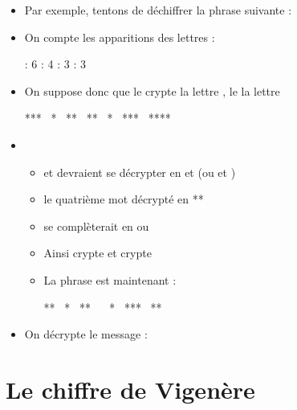 \begin{frame}

\begin{itemize}
        \item Par exemple, tentons de déchiffrer la phrase suivante : \\
\centerline{}
\pause  
  \item On compte les apparitions des lettres : \\
\centerline{ : 6 \qquad {} : 4 \qquad {} : 3 \qquad {} : 3}
\pause  
  \item On suppose donc que le  crypte la lettre , le  la lettre  \\
  \pause
\centerline{*** \ * \ ** \ ** \ * \ *** \ ****}
\pause   
  \item
  \begin{itemize}
    \item  {} et  devraient se décrypter en  et  (ou  et )
\pause  
    \item le quatrième mot  décrypté en **
\pause  
    \item se complèterait en  ou  
\pause    
    \item Ainsi  crypte  et  crypte 
\pause    
    \item La phrase est maintenant : \\
\centerline{** \  * \  ** \   \  * \ *** \ **}
  \end{itemize}
\pause  
  \item On décrypte le message : \\
\centerline{}

\end{itemize}


\end{frame}


\section{Le chiffre de Vigenère}




